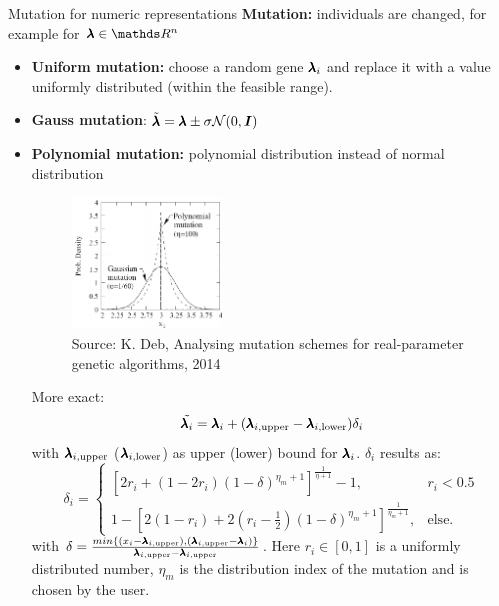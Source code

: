 \begin{frame}{Mutation for numeric representations}
  \textbf{Mutation:} individuals are changed, for example for $\xx \in \R^n$
  \begin{itemize}
  \item \textbf{Uniform mutation:} choose a random gene $\xxi$ and replace it with a value uniformly distributed (within the feasible range).
  \item \textbf{Gauss mutation}: $\tilde\xx = \xx \pm \sigma \mathcal{N}(0, \boldsymbol{I})$
  \item \textbf{Polynomial mutation:} polynomial distribution instead of normal distribution
  \begin{center}
  \begin{figure}
    \includegraphics[height = 3.5cm, width = 4cm]{images/polynomial_mutation.png}\\
    \scriptsize{Source: K. Deb, Analysing mutation schemes for real-parameter genetic algorithms, 2014}
  \end{figure}
   \end{center}
   \framebreak
  More exact:
  $$
  {\tilde \xxi} = \xxi + (\xxi[i,\text{upper}] - \xxi[i,\text{lower}]) \delta_{i}
  $$
  with $\xxi[i,\text{upper}]$ ($\xxi[i,\text{lower}]$) as upper (lower) bound for $\xxi$.
  $\delta_{i}$ results as:
  \footnotesize
  $$
  \delta_{i} =
  \begin{cases}
  [2r_{i}+(1-2r_{i})(1-\delta)^{\eta_{m}+1}]^{\frac{1}{\eta +1}} -1, & r_{i} < 0.5 \\
  1 - [2(1-r_{i})+2(r_{i}-\frac{1}{2})(1-\delta)^{\eta_{m}+1}]^{\frac{1}{\eta_{m} +1}}, &  \text{else.}
  \end{cases}
  $$
  with  $\delta = \frac{min\{(x_{i} - \xxi[i,\text{upper}]), (\xxi[i,\text{upper}]-\xxi)\}}{\xxi[i,\text{upper}] - \xxi[i,\text{upper}]}$.
  \normalsize
  \vspace{0.5cm}
  Here $r_{i} \in [0,1]$ is a uniformly distributed number, $\eta_{m}$ is the distribution index of the mutation and is chosen by the user.\\

\end{itemize}
\end{frame}
